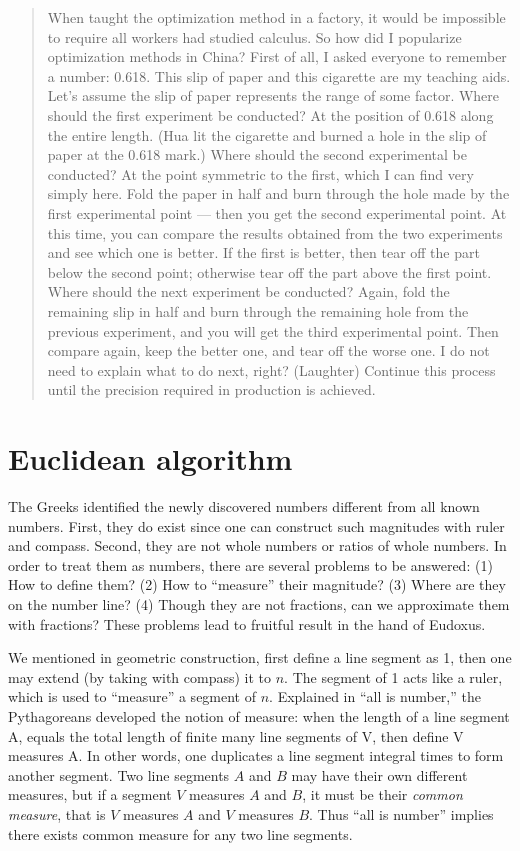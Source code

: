 \documentclass[b5paper]{article}
\begin{document}
\begin{quotation}
When taught the optimization method in a factory, it would be impossible to require all workers had studied calculus. So how did I popularize optimization methods in China? First of all, I asked everyone to remember a number: 0.618. This slip of paper and this cigarette are my teaching aids. Let's assume the slip of paper represents the range of some factor. Where should the first experiment be conducted? At the position of 0.618 along the entire length. (Hua lit the cigarette and burned a hole in the slip of paper at the 0.618 mark.) Where should the second experimental be conducted? At the point symmetric to the first, which I can find very simply here. Fold the paper in half and burn through the hole made by the first experimental point — then you get the second experimental point. At this time, you can compare the results obtained from the two experiments and see which one is better. If the first is better, then tear off the part below the second point; otherwise tear off the part above the first point. Where should the next experiment be conducted? Again, fold the remaining slip in half and burn through the remaining hole from the previous experiment, and you will get the third experimental point. Then compare again, keep the better one, and tear off the worse one. I do not need to explain what to do next, right? (Laughter) Continue this process until the precision required in production is achieved.
\end{quotation}

\section{Euclidean algorithm}
\label{sec:Euclidean-algorithm}

The Greeks identified the newly discovered numbers different from all known numbers. First, they do exist since one can construct such magnitudes with ruler and compass. Second, they are not whole numbers or ratios of whole numbers. In order to treat them as numbers, there are several problems to be answered: (1) How to define them? (2) How to \enquote{measure} their magnitude? (3) Where are they on the number line? (4) Though they are not fractions, can we approximate them with fractions? These problems lead to fruitful result in the hand of Eudoxus.

We mentioned in geometric construction, first define a line segment as 1, then one may extend (by taking with compass) it to $n$. The segment of 1 acts like a ruler, which is used to \enquote{measure} a segment of $n$. Explained in \enquote{all is number,} the Pythagoreans developed the notion of measure: when the length of a line segment A, equals the total length of finite many line segments of V, then define V measures A. In other words, one duplicates a line segment integral times to form another segment. Two line segments $A$ and $B$ may have their own different measures, but if a segment $V$ measures $A$ and $B$, it must be their \emph{common measure}, that is $V$ measures $A$ and $V$ measures $B$. Thus \enquote{all is number} implies there exists common measure for any two line segments.
\end{document}
